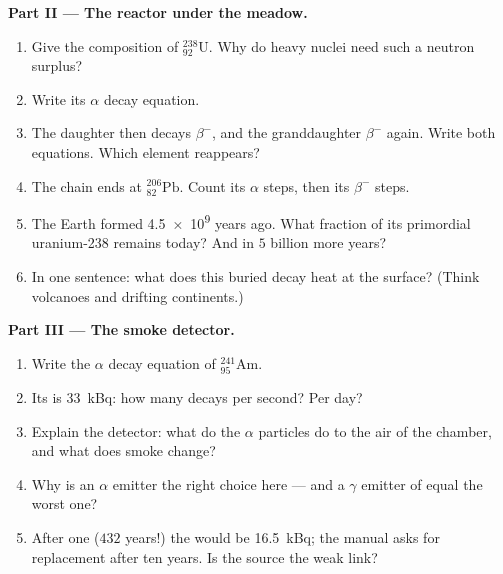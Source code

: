 \begin{problem}
\medskip
\noindent\textbf{Part II --- The reactor under the meadow.}
\begin{enumerate}[resume]
  \item Give the composition of ${}^{238}_{92}\mathrm{U}$. Why do heavy
        nuclei need such a neutron surplus?
  \item Write its $\alpha$ decay equation.
  \item The daughter then decays $\beta^-$, and the granddaughter
        $\beta^-$ again. Write both equations. Which element reappears?
  \item The chain ends at ${}^{206}_{82}\mathrm{Pb}$. Count its $\alpha$
        steps, then its $\beta^-$ steps.
  \item The Earth formed \num{4.5e9} years ago. What fraction of its
        primordial uranium-238 remains today? And in $5$ billion more years?
  \item In one sentence: what does this buried decay heat  at the
        surface? (Think volcanoes and drifting continents.)
\end{enumerate}

\medskip
\noindent\textbf{Part III --- The smoke detector.}
\begin{enumerate}[resume]
  \item Write the $\alpha$ decay equation of ${}^{241}_{95}\mathrm{Am}$.
  \item Its  is \qty{33}{kBq}: how many decays per second? Per day?
  \item Explain the detector: what do the $\alpha$ particles do to the air
        of the chamber, and what does smoke change?
  \item Why is an $\alpha$ emitter the right choice here --- and a
        $\gamma$ emitter of equal  the worst one?
  \item After one  ($432$ years!) the  would be
        \qty{16.5}{kBq}; the manual asks for replacement after ten years.
        Is the source the weak link?
\end{enumerate}


\end{problem}

